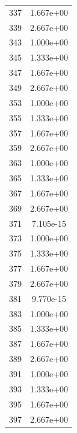 \documentclass[12pt]{article}
\begin{document}
\begin{longtable}{@{}cc@{}}
337 & 1.667e+00 \\
339 & 2.667e+00 \\
343 & 1.000e+00 \\
345 & 1.333e+00 \\
347 & 1.667e+00 \\
349 & 2.667e+00 \\
353 & 1.000e+00 \\
355 & 1.333e+00 \\
357 & 1.667e+00 \\
359 & 2.667e+00 \\
363 & 1.000e+00 \\
365 & 1.333e+00 \\
367 & 1.667e+00 \\
369 & 2.667e+00 \\
371 & 7.105e-15 \\
373 & 1.000e+00 \\
375 & 1.333e+00 \\
377 & 1.667e+00 \\
379 & 2.667e+00 \\
381 & 9.770e-15 \\
383 & 1.000e+00 \\
385 & 1.333e+00 \\
387 & 1.667e+00 \\
389 & 2.667e+00 \\
391 & 1.000e+00 \\
393 & 1.333e+00 \\
395 & 1.667e+00 \\
397 & 2.667e+00 \\

\bottomrule
\end{longtable}
\end{document}
